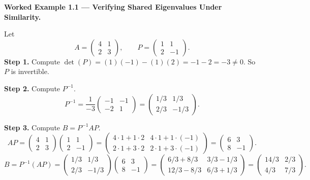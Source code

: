\documentclass[12pt,a4paper]{article}
\begin{document}
\textbf{Worked Example 1.1 --- Verifying Shared Eigenvalues Under Similarity.}

Let
\[
  A = \begin{pmatrix} 4 & 1 \\ 2 & 3 \end{pmatrix}, \qquad
  P = \begin{pmatrix} 1 & 1 \\ 2 & -1 \end{pmatrix}.
\]
\textbf{Step 1.} Compute $\det(P) = (1)(-1)-(1)(2) = -1-2 = -3 \neq 0$. So $P$ is invertible.

\textbf{Step 2.} Compute $P^{-1}$.
\[
  P^{-1} = \frac{1}{-3}\begin{pmatrix} -1 & -1 \\ -2 & 1 \end{pmatrix}
          = \begin{pmatrix} 1/3 & 1/3 \\ 2/3 & -1/3 \end{pmatrix}.
\]

\textbf{Step 3.} Compute $B = P^{-1}AP$.
\[
  AP = \begin{pmatrix} 4 & 1 \\ 2 & 3 \end{pmatrix}\begin{pmatrix} 1 & 1 \\ 2 & -1 \end{pmatrix}
     = \begin{pmatrix} 4\cdot1+1\cdot2 & 4\cdot1+1\cdot(-1) \\ 2\cdot1+3\cdot2 & 2\cdot1+3\cdot(-1) \end{pmatrix}
     = \begin{pmatrix} 6 & 3 \\ 8 & -1 \end{pmatrix}.
\]
\[
  B = P^{-1}(AP) = \begin{pmatrix} 1/3 & 1/3 \\ 2/3 & -1/3 \end{pmatrix}\begin{pmatrix} 6 & 3 \\ 8 & -1 \end{pmatrix}
    = \begin{pmatrix} 6/3+8/3 & 3/3-1/3 \\ 12/3-8/3 & 6/3+1/3 \end{pmatrix}
    = \begin{pmatrix} 14/3 & 2/3 \\ 4/3 & 7/3 \end{pmatrix}.
\]
\end{document}
